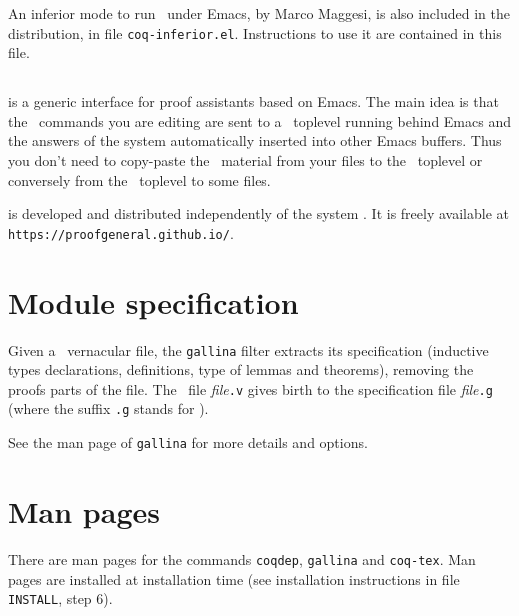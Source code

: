 An inferior mode to run \Coq\ under Emacs, by Marco Maggesi, is also
included in the distribution, in file \texttt{coq-inferior.el}.
Instructions to use it are contained in this file.

\subsection[{\ProofGeneral}]{{\ProofGeneral}}

{\ProofGeneral} is a generic interface for proof assistants based on
Emacs. The main idea is that the \Coq\ commands you are
editing are sent to a \Coq\ toplevel running behind Emacs and the
answers of the system automatically inserted into other Emacs buffers.
Thus you don't need to copy-paste the \Coq\ material from your files
to the \Coq\ toplevel or conversely from the \Coq\ toplevel to some
files.

{\ProofGeneral} is developed and distributed independently of the
system \Coq. It is freely available at \verb!https://proofgeneral.github.io/!.


\section[Module specification]{Module specification\label{gallina}}

Given a \Coq\ vernacular file, the {\tt gallina} filter extracts its
specification (inductive types declarations, definitions, type of
lemmas and theorems), removing the proofs parts of the file. The \Coq\
file {\em file}{\tt.v} gives birth to the specification file
{\em file}{\tt.g} (where the suffix {\tt.g} stands for \gallina).

See the man page of {\tt gallina} for more details and options.


\section[Man pages]{Man pages\label{ManPages}}

There are man pages for the commands {\tt coqdep}, {\tt gallina} and
{\tt coq-tex}. Man pages are installed at installation time
(see installation instructions in file {\tt INSTALL}, step 6).



